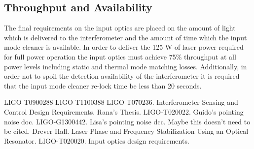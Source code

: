 \documentclass[10pt,a4paper]{article}
\begin{document}
\subsection{Throughput and Availability}
The final requirements on the input optics are placed on the amount of light which is delivered 
to the interferometer and the amount of time which the input mode cleaner is available.  
In order to deliver the 125 W of laser power required for full power operation the input optics 
must achieve 75\% throughput at all power levels including static and thermal mode matching losses.  
Additionally, in order not to spoil the detection availability of the interferometer 
it is required that the input mode cleaner re-lock time be less than 20 seconds.  

















\begin{thebibliography}{9}
		LIGO-T0900288
		LIGO-T1100388	
	  LIGO-T070236.  Interferometer Sensing and Control Design Requirements.
		Rana's Thesis.  
		LIGO-T020022. Guido's pointing noise doc.
		LIGO-G1300442. Lisa's pointing noise dcc. Maybe this doesn't need to be cited.  
		Drever Hall.  Laser Phase and Frequency Stabilization Using an Optical Resonator.		
		LIGO-T020020. Input optics design requirements.	
\end{thebibliography}
\end{document}

